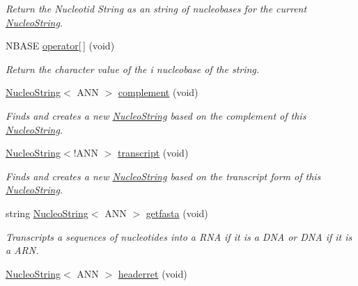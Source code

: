 \begin{DoxyCompactItemize}
\begin{DoxyCompactList}\small\item\em Return the Nucleotid String as an string of nucleobases for the current \hyperlink{class_nucleo_string}{Nucleo\-String}. \end{DoxyCompactList}\item 
\hypertarget{class_nucleo_string_a935a90aff9bb66155447b40653db5eae}{N\-B\-A\-S\-E \hyperlink{class_nucleo_string_a935a90aff9bb66155447b40653db5eae}{operator\mbox{[}$\,$\mbox{]}} (void)}\label{class_nucleo_string_a935a90aff9bb66155447b40653db5eae}

\begin{DoxyCompactList}\small\item\em Return the character value of the i nucleobase of the string. \end{DoxyCompactList}\item 
\hyperlink{class_nucleo_string}{Nucleo\-String}$<$ A\-N\-N $>$ \hyperlink{class_nucleo_string_ad89515d3ea45e52d7d462a86a819ce2f}{complement} (void)
\begin{DoxyCompactList}\small\item\em Finds and creates a new \hyperlink{class_nucleo_string}{Nucleo\-String} based on the complement of this \hyperlink{class_nucleo_string}{Nucleo\-String}. \end{DoxyCompactList}\item 
\hyperlink{class_nucleo_string}{Nucleo\-String}$<$!A\-N\-N $>$ \hyperlink{class_nucleo_string_a2e88c6612f12dbf9d2810015be8ccc8a}{transcript} (void)
\begin{DoxyCompactList}\small\item\em Finds and creates a new \hyperlink{class_nucleo_string}{Nucleo\-String} based on the transcript form of this \hyperlink{class_nucleo_string}{Nucleo\-String}. \end{DoxyCompactList}\item 
string \hyperlink{class_nucleo_string}{Nucleo\-String}$<$ A\-N\-N $>$ \hyperlink{class_nucleo_string_a3e665fd9d81b9f1e162069022a786211}{getfasta} (void)
\begin{DoxyCompactList}\small\item\em Transcripts a sequences of nucleotides into a R\-N\-A if it is a D\-N\-A or D\-N\-A if it is a A\-R\-N. \end{DoxyCompactList}\item 
\hypertarget{class_nucleo_string_a63da649997533b0a339f87f221225c92}{\hyperlink{class_nucleo_string}{Nucleo\-String}$<$ A\-N\-N $>$ \hyperlink{class_nucleo_string_a63da649997533b0a339f87f221225c92}{headerret} (void)}\label{class_nucleo_string_a63da649997533b0a339f87f221225c92}


\end{DoxyCompactItemize}
